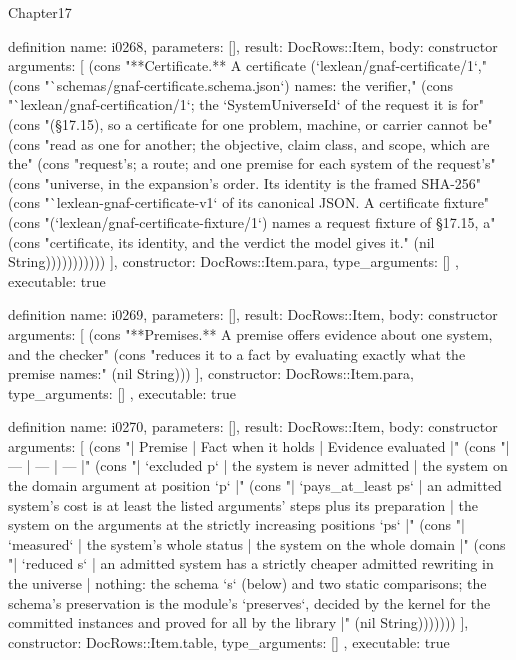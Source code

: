 \begin{lexlean}{Chapter17}
\begin{semanticmodule}
definition{
  name: i0268,
  parameters: [],
  result: DocRows::Item,
  body: constructor{
    arguments: [
      (cons "**Certificate.** A certificate (`lexlean/gnaf-certificate/1`," (cons "`schemas/gnaf-certificate.schema.json`) names: the verifier," (cons "`lexlean/gnaf-certification/1`; the `SystemUniverseId` of the request it is for" (cons "(§17.15), so a certificate for one problem, machine, or carrier cannot be" (cons "read as one for another; the objective, claim class, and scope, which are the" (cons "request's; a route; and one premise for each system of the request's" (cons "universe, in the expansion's order. Its identity is the framed SHA-256" (cons "`lexlean-gnaf-certificate-v1` of its canonical JSON. A certificate fixture" (cons "(`lexlean/gnaf-certificate-fixture/1`) names a request fixture of §17.15, a" (cons "certificate, its identity, and the verdict the model gives it." (nil String)))))))))))
    ],
    constructor: DocRows::Item.para,
    type_arguments: []
  },
  executable: true
}

definition{
  name: i0269,
  parameters: [],
  result: DocRows::Item,
  body: constructor{
    arguments: [
      (cons "**Premises.** A premise offers evidence about one system, and the checker" (cons "reduces it to a fact by evaluating exactly what the premise names:" (nil String)))
    ],
    constructor: DocRows::Item.para,
    type_arguments: []
  },
  executable: true
}

definition{
  name: i0270,
  parameters: [],
  result: DocRows::Item,
  body: constructor{
    arguments: [
      (cons "| Premise | Fact when it holds | Evidence evaluated |" (cons "| --- | --- | --- |" (cons "| `excluded p` | the system is never admitted | the system on the domain argument at position `p` |" (cons "| `pays_at_least ps` | an admitted system's cost is at least the listed arguments' steps plus its preparation | the system on the arguments at the strictly increasing positions `ps` |" (cons "| `measured` | the system's whole status | the system on the whole domain |" (cons "| `reduced s` | an admitted system has a strictly cheaper admitted rewriting in the universe | nothing: the schema `s` (below) and two static comparisons; the schema's preservation is the module's `preserves`, decided by the kernel for the committed instances and proved for all by the library |" (nil String)))))))
    ],
    constructor: DocRows::Item.table,
    type_arguments: []
  },
  executable: true
}


\end{semanticmodule}
\end{lexlean}
